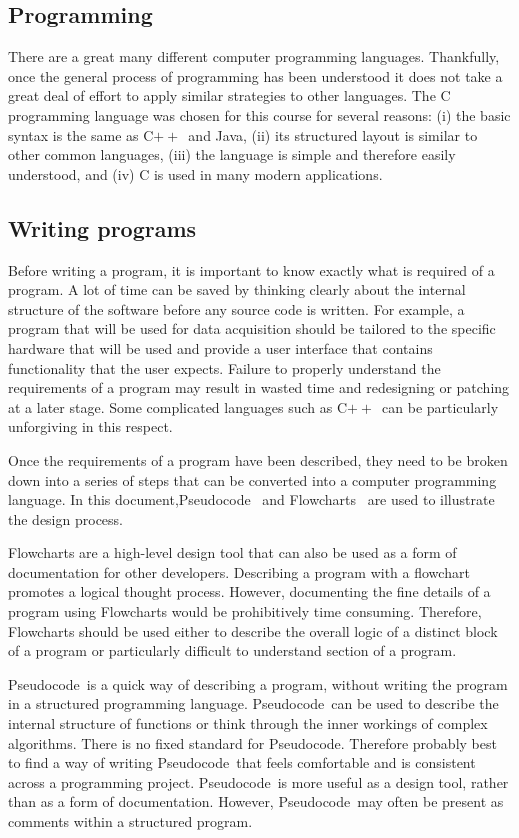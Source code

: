 \documentclass[11pt]{scrartcl}
\def\cpp{C$++$}
\def\psc{Pseudocode}
\def\java{Java}
\begin{document}
\subsection{Programming}
There are a great many different computer programming languages.  Thankfully, once the general process of programming has been understood it does not take a great deal of effort to apply similar strategies to other languages.  The C programming language was chosen for this course for several reasons: (i) the basic syntax is the same as \cpp\ and \java, (ii) its structured layout is similar to other common languages, (iii) the language is simple and therefore easily understood, and (iv) C is used in many modern applications.

\subsection{Writing programs}
Before writing a program, it is important to know exactly what is required of a program.  A lot of time can be saved by thinking clearly about the internal structure of the software before any source code is written.  For example, a program that will be used for data acquisition should be tailored to the specific hardware that will be used and provide a user interface that contains functionality that the user expects.  Failure to properly understand the requirements of a program may result in wasted time and redesigning or patching at a later stage.  Some complicated languages such as \cpp\ can be particularly unforgiving in this respect.

Once the requirements of a program have been described, they need to be broken down into a series of steps that can be converted into a computer programming language.  In this document,\psc~\cite{pseudocodewiki} and Flowcharts~\cite{flowchartwiki} are used to illustrate the design process.

Flowcharts are a high-level design tool that can also be used as a form of documentation for other developers.  Describing a program with a flowchart promotes a logical thought process.  However, documenting the fine details of a program using Flowcharts would be prohibitively time consuming.  Therefore, Flowcharts should be used either to describe the overall logic of a distinct block of a program or particularly difficult to understand section of a program.

\psc\ is a quick way of describing a program, without writing the program in a structured programming language.  \psc\ can be used to describe the internal structure of functions or think through the inner workings of complex algorithms.  There is no fixed standard for \psc.  Therefore probably best to find a
way of writing \psc\ that feels comfortable and is consistent across a programming project.  \psc\ is more useful as a design tool, rather than as a form of documentation.  However, \psc\ may  often be present as comments within a structured program.
\end{document}

